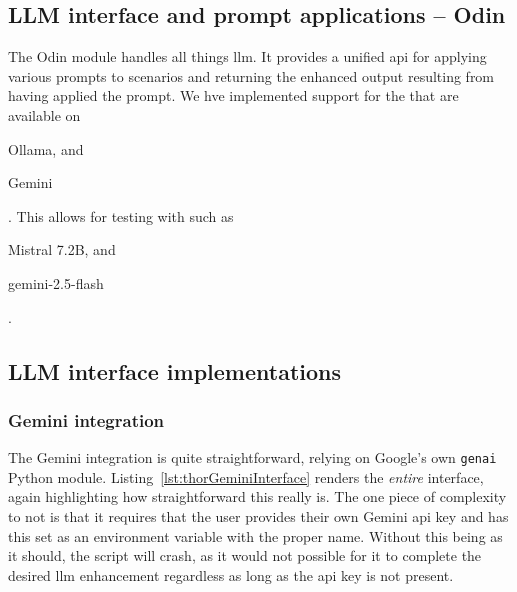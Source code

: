 \subsection{LLM interface and prompt applications -- Odin}\label{sec:odinImplementation}


The Odin module handles all things \acrshort{llm}. It provides a unified
\acrshort{api} for applying various prompts to scenarios and returning the
enhanced output resulting from having applied the prompt. We hve implemented
support for the  that are available on \begin{inparaenum}
    \item Ollama, and
    \item Gemini
\end{inparaenum}. This allows for testing with  such as
\begin{inparaenum}\setcounter{enumi}{2}
    \item Mistral \num{7.2}B, and
    \item gemini-2.5-flash
\end{inparaenum}.

\subsection*{LLM interface implementations}
\subsubsection{Gemini integration}

The Gemini integration is quite straightforward, relying on Google's own
\texttt{genai} Python module. Listing~\ref{lst:thorGeminiInterface} renders the
\emph{entire} interface, again highlighting how straightforward this really is.
The one piece of complexity to not is that it requires that the user provides
their own Gemini \acrshort{api} key and has this set as an environment variable
with the proper name. Without this being as it should, the script will crash, as
it would not possible for it to complete the desired \acrshort{llm} enhancement
regardless as long as the \acrshort{api} key is not present.

